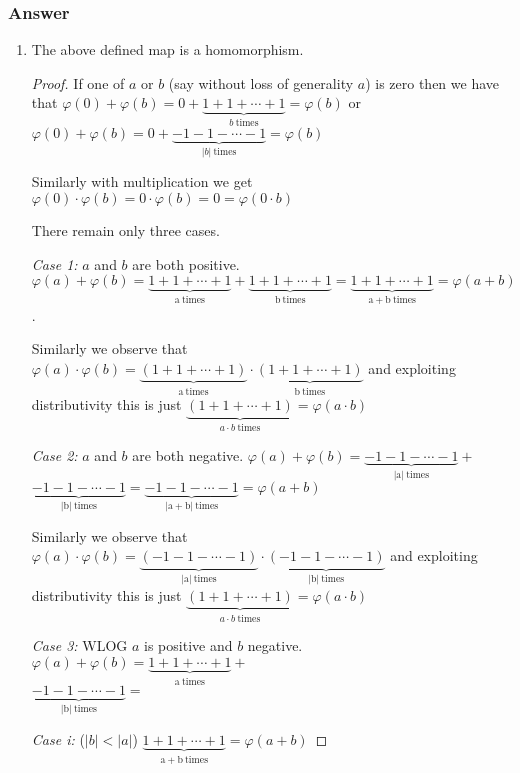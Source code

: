 \documentclass[12pt]{article}
\begin{document}
\subsubsection{Answer}
\begin{enumerate}
\item The above defined map is a homomorphism. \begin{proof} 

If one of $a$ or $b$ (say without loss of generality $a$) is zero then we have that $\varphi(0)+\varphi(b)= 0 + \underbrace{1+1+\cdots+1}_{b \mathrm{\ times}}= \varphi(b)$ or $\varphi(0)+\varphi(b)= 0 + \underbrace{-1-1-\cdots-1}_{|b| \mathrm{\ times}}= \varphi(b)$


Similarly with multiplication we get $\varphi(0) \cdot \varphi(b) = 0 \cdot \varphi(b)= 0 = \varphi(0 \cdot b) $

There remain only three cases. 


\emph{Case 1:}  $a$ and $b$ are both positive. $\varphi(a)+\varphi(b) = \underbrace{1+1+\cdots +1}_{\mathrm{a\ times}} + \underbrace{1+1+\cdots +1}_{\mathrm{b\ times}} =\underbrace{1+1+\cdots+1}_\mathrm{a+b\ times}=\varphi(a+b)$.



Similarly we observe that  $\varphi(a) \cdot \varphi(b) = \underbrace{ \left( 1+1+\cdots +1\right) }_\mathrm{a\ times} \cdot \underbrace{ \left( 1+1+\cdots +1\right)}_\mathrm{b\ times}$ and exploiting distributivity this is just $ \underbrace{ \left( 1+1+\cdots +1\right) }_{a\cdot b\mathrm{\ times}} = \varphi(a\cdot b)$

\emph{Case 2:}  $a$ and $b$ are both negative. $\varphi(a)+\varphi(b) = \underbrace{-1-1-\cdots -1}_{\mathrm{|a|\ times}} +$\\$ \underbrace{-1-1-\cdots -1}_{\mathrm{|b|\ times}} =\underbrace{-1-1-\cdots-1}_\mathrm{|a+b|\ times}=\varphi(a+b)$ 

Similarly we observe that  $\varphi(a) \cdot \varphi(b) = \underbrace{ \left( -1-1-\cdots -1\right) }_\mathrm{|a|\ times} \cdot \underbrace{ \left(- 1-1-\cdots -1\right)}_\mathrm{|b|\ times}$ and exploiting distributivity this is just $ \underbrace{ \left( 1+1+\cdots +1\right) }_{a\cdot b\mathrm{\ times}} = \varphi(a\cdot b)$

\emph{Case 3:}  WLOG $a$ is positive and $b$ negative. $\varphi(a)+\varphi(b) = \underbrace{1+1+\cdots +1}_{\mathrm{a\ times}} + $\\$\underbrace{-1-1-\cdots -1}_{\mathrm{|b|\ times}} = $

\emph{Case i:} ($|b|<|a|$) $ \underbrace{1+1+\cdots+1}_\mathrm{a+b\ times}=\varphi(a+b)$ 


\end{proof}
\end{enumerate}
\end{document}
